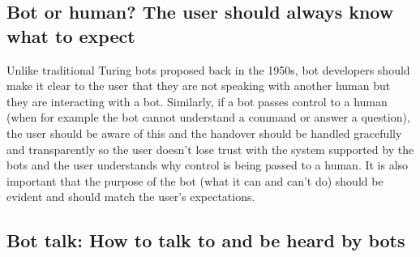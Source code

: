 \documentclass{sig-alternate}
\begin{document}
	\subsection{Bot or human? The user should always know what to expect}

	Unlike traditional Turing bots proposed back in the 1950s, bot developers should make it clear to the user that they are not speaking with another human but they are interacting with a bot. 
	Similarly, if a bot passes control to a human (when for example the bot cannot understand a command or answer a question), the user should be aware of this and the handover should be handled gracefully and transparently so the user doesn't lose trust with the system supported by the bots and the user understands why control is being passed to a human. 
	It is also important that the purpose of the bot (what it can and can't do) should be evident and should match the user's expectations. 


	\subsection{Bot talk: How to talk to and be heard by bots}
\end{document}
